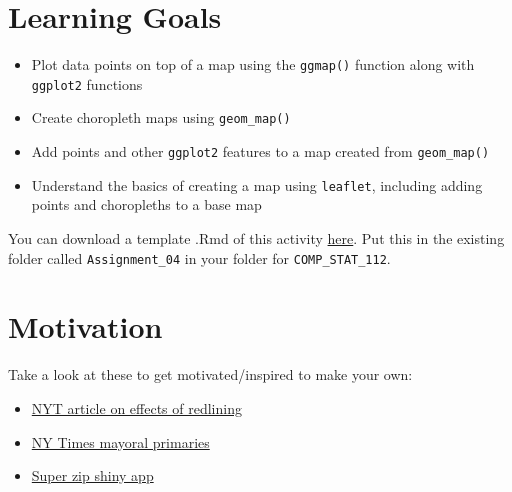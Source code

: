 \documentclass[
  letterpaper,
  DIV=11,
  numbers=noendperiod]{scrreprt}
\providecommand{\tightlist}{%
  \setlength{\itemsep}{0pt}\setlength{\parskip}{0pt}}\usepackage{longtable,booktabs,array}
\begin{document}
\section*{Learning Goals}\label{learning-goals-5}


\begin{itemize}
\tightlist
\item
  Plot data points on top of a map using the \texttt{ggmap()} function
  along with \texttt{ggplot2} functions\\
\item
  Create choropleth maps using \texttt{geom\_map()}\\
\item
  Add points and other \texttt{ggplot2} features to a map created from
  \texttt{geom\_map()}\\
\item
  Understand the basics of creating a map using \texttt{leaflet},
  including adding points and choropleths to a base map
\end{itemize}

You can download a template .Rmd of this activity
\href{template_rmd/06-Spatial_Viz_Assign.Rmd}{here}. Put this in the
existing folder called \texttt{Assignment\_04} in your folder for
\texttt{COMP\_STAT\_112}.

\section*{Motivation}\label{motivation}


Take a look at these to get motivated/inspired to make your own:

\begin{itemize}
\tightlist
\item
  \href{https://www.nytimes.com/interactive/2020/08/24/climate/racism-redlining-cities-global-warming.html?fbclid=IwAR1iX20gZcHt-HERYeJs0t2fjSXRJh2aBYYSfSkpc50dBvfByBCWezTSXbw}{NYT
  article on effects of redlining}
\item
  \href{http://www.nytimes.com/projects/elections/2013/nyc-primary/mayor/map.html}{NY
  Times mayoral primaries}
\item
  \href{http://shiny.rstudio.com/gallery/superzip-example.html}{Super
  zip shiny app}
\end{itemize}
\end{document}
